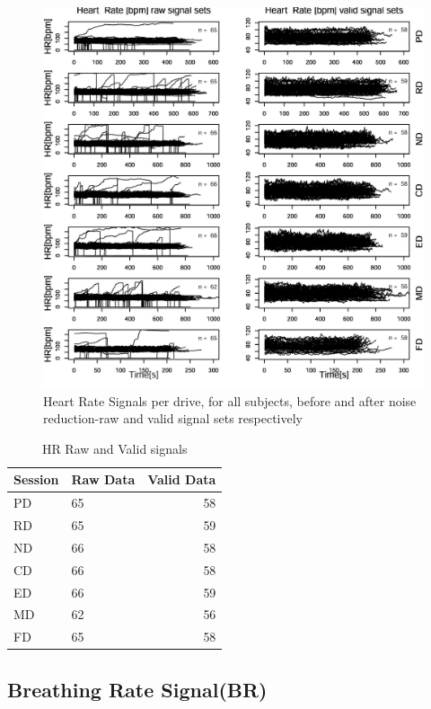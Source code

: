 \documentclass[a4paper]{article}
\begin{document}
\begin{figure}[!h]
\centering
\includegraphics[width=1.0\textwidth]{hr.jpg}
\caption{\label{fig:hr}Heart Rate Signals per drive, for all subjects, before and after noise reduction-raw and valid signal sets respectively}
\end{figure}
\FloatBarrier
\begin{table}[!h]
\centering
\begin{tabular}{l|l|r}
Session & Raw Data & Valid Data \\\hline
 PD & 65 & 58 \\
RD & 65 & 59 \\
ND & 66 & 58 \\
CD & 66 & 58 \\
ED & 66 & 59 \\
MD & 62 & 56 \\
FD & 65 & 58 
 
 \end{tabular}
 \caption{\label{tab:hr}HR Raw and Valid signals}
 \end{table}

\FloatBarrier
\subsection{Breathing Rate Signal(BR)}
\end{document}
